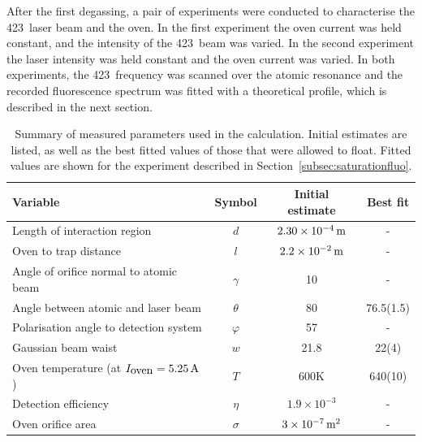 After the first degassing, a pair of experiments were conducted to characterise the 423\nm\, laser beam and the \CaI{} oven. In the first experiment the oven current was held constant, and the intensity of the 423\nm\, beam was varied. In the second experiment the laser intensity was held constant and the oven current was varied. In both experiments, the 423\nm\, frequency was scanned over the atomic resonance and the recorded fluorescence spectrum was fitted with a theoretical profile, which is described in the next section.




\begin{table}[t]
\begin{center}
\begin{tabular}{|l|c|c|c|}
\hline \textbf{Variable} & \textbf{Symbol}  & \textbf{Initial estimate} & \textbf{Best fit} \\ 
\hline  
Length of interaction region	& $d$					&	$2.30 \times 10^{-4}\,\mbox{m}$		&  -  \\
Oven to trap distance		&	$l$					&	$2.2 \times 10^{-2} \,\mbox{m}$		& - \\	
Angle of orifice normal to atomic beam & $\gamma$				&	10\degree			& - \\
Angle between atomic and laser beam 	&	$\theta$		&	80\degree			& 76.5(1.5)\degree \\
Polarisation angle to detection system & $\varphi$				&	57\degree			& - \\
Gaussian beam waist		&	$w$					&	21.8\um	& 22(4)\um \\	
Oven temperature (at $I_{\mbox{oven}} = 5.25\,\mbox{A}$)	&$T$ 	&	600K				& 640(10)\K \\
Detection efficiency	& $\eta$					&	$1.9 \times 10^{-3}$		& - \\
Oven orifice area		& 	$\sigma$				&	$3 \times 10^{-7}\,\mbox{m}^2$		& - \\
\hline 
\end{tabular} 
\caption{Summary of measured parameters used in the calculation. Initial estimates are listed, as well as the best fitted values of those that were allowed to float. Fitted values are shown for the experiment described in Section~\ref{subsec:saturationfluo}.}
\label{tab:neutralfluo}
\end{center}
\end{table}



